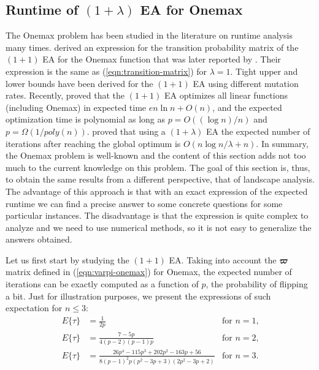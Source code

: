 \documentclass{article}
\def\vec#1{\mathchoice{\mbox{\boldmath$\displaystyle#1$}}
  {\mbox{\boldmath$\textstyle#1$}}
  {\mbox{\boldmath$\scriptstyle#1$}}
  {\mbox{\boldmath$\scriptscriptstyle#1$}}}
\newcommand{\Exp}[1]{E\{#1\}}
\begin{document}
\subsection{Runtime of $(1+\lambda)$ EA for Onemax}

The Onemax problem has been studied in the literature on runtime analysis many times. \cite{Garnier1999} derived an expression for the transition probability matrix of the $(1+1)$ EA for the Onemax function that was later reported by \cite{He:Yao2003}. Their expression is the same as (\ref{eqn:transition-matrix}) for $\lambda=1$. Tight upper and lower bounds have been derived for the $(1+1)$ EA using different mutation rates. 
Recently, \citet{Witt2013tight} proved that the $(1+1)$ EA optimizes all linear functions (including Onemax) in expected time $en \ln n + O(n)$, and the expected optimization time is polynomial as long as $p = O((\log n)/n)$ and $p = \Omega(1/poly(n))$. \citet{Jansen2005} proved that using a $(1+\lambda)$ EA the expected number of iterations after reaching the global optimum is $O(n \log n/\lambda +n)$.
In summary, the Onemax problem is well-known and the content of this section adds not too much to the current knowledge on this problem. The goal of this section is, thus, to obtain the same results from a different perspective, that of landscape analysis. The advantage of this approach is that with an exact expression of the expected runtime we can find a precise answer to some concrete questions for some particular instances. The disadvantage is that the expression is quite complex to analyze and we need to use numerical methods, so it is not easy to generalize the answers obtained. 


Let us first start by studying the $(1+1)$ EA. Taking into account the $\vec{\varpi}$ matrix defined in (\ref{eqn:varpi-onemax}) for Onemax, the expected number of iterations can be exactly computed as a function of $p$, the probability of flipping a bit. Just for illustration purposes, we present the expressions of such expectation for $n\leq 3$:
\begin{align}
\label{eqn:exp-n1}\Exp{\tau} &= \frac{1}{2 p} & \text{for $n=1$,} \\
\label{eqn:exp-n2}\Exp{\tau} &= \frac{7-5 p}{4 (p-2) (p-1) p} & \text{for $n=2$,} \\
\label{eqn:exp-n3}\Exp{\tau} &= \frac{26 p^4-115 p^3+202 p^2-163 p+56}{8 (p-1)^2 p \left(p^2-3 p+3\right) \left(2 p^2-3 p+2\right)} & \text{for $n=3$.}
\end{align}
\end{document}
